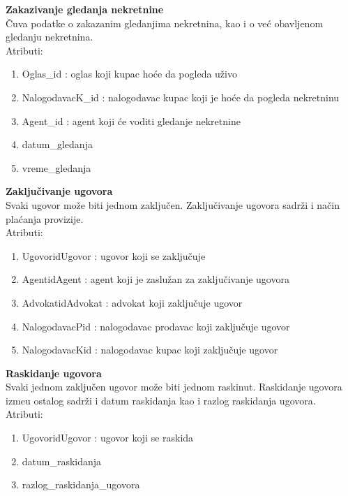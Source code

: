 \documentclass[20pt]{article}
\begin{document}
\newpage
{\bfseries Zakazivanje gledanja nekretnine}\\
\v {C}uva podatke o zakazanim gledanjima nekretnina, kao i o ve\' c obavljenom gledanju nekretnina.\\
\indent Atributi:
\begin{enumerate}
        \item  Oglas\_id : oglas koji kupac ho\' ce da pogleda u\v {z}ivo
        \item  NalogodavacK\_id : nalogodavac kupac koji je ho\' ce da pogleda nekretninu
        \item  Agent\_id : agent koji \' ce voditi gledanje nekretnine
        \item datum\_gledanja
        \item vreme\_gledanja
\end{enumerate}
{\bfseries Zaklju\v {c}ivanje ugovora}\\
Svaki ugovor mo\v {z}e biti jednom zaklju\v {c}en. Zaklju\v {c}ivanje ugovora sadr\v {z}i i na\v {c}in pla\' canja provizije.\\
\indent Atributi:
\begin{enumerate}
        \item  UgovoridUgovor : ugovor koji se zaklju\v {c}uje
        \item  AgentidAgent : agent koji je zaslu\v {z}an za zaklju\v {c}ivanje ugovora
        \item  AdvokatidAdvokat : advokat koji zaklju\v {c}uje ugovor
        \item NalogodavacPid : nalogodavac prodavac koji zaklju\v {c}uje ugovor
        \item NalogodavacKid : nalogodavac kupac koji zaklju\v {c}uje ugovor
\end{enumerate}
{\bfseries Raskidanje ugovora}\\
Svaki jednom zaklju\v {c}en ugovor mo\v {z}e biti jednom raskinut. Raskidanje ugovora izme\dj u ostalog sadr\v {z}i i datum raskidanja kao i razlog raskidanja ugovora.\\
\indent Atributi:
\begin{enumerate}
        \item  UgovoridUgovor : ugovor koji se raskida
        \item  datum\_raskidanja
        \item  razlog\_raskidanja\_ugovora
\end{enumerate}

\newpage
\end{document}
